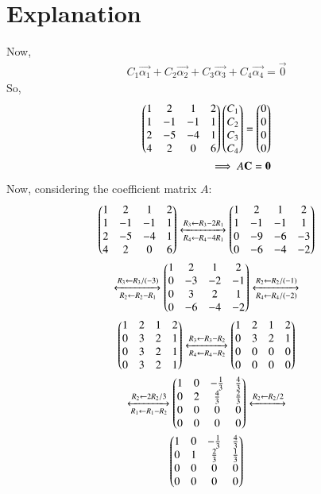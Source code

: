 \documentclass[journal,12pt,twocolumn]{IEEEtran}
\begin{document}
\section{Explanation}
Now,
\begin{align}
C_1 \vec{\alpha_1} +C_2 \vec{\alpha_2}+C_3 \vec{\alpha_3}+C_4 \vec{\alpha_4} = \vec{0}
\end{align}
So, 
\begin{align}
\begin{pmatrix}1 & 2 & 1 & 2\\1 & -1 & -1 & 1\\2 & -5 & -4 & 1\\4 & 2 & 0 & 6\end{pmatrix} \begin{pmatrix}C_1\\C_2\\C_3\\C_4\end{pmatrix} = \begin{pmatrix}0\\0\\0\\0\end{pmatrix}\\
\implies A\mathbf{C} = \mathbf{0}
\end{align}
Now, considering the coefficient matrix $A$:
\begin{multline}
\begin{pmatrix}1 & 2 & 1 & 2\\1 & -1 & -1 & 1\\2 & -5 & -4 & 1\\4 & 2 & 0 & 6\end{pmatrix} \xleftrightarrow[R_4\leftarrow R_4 - 4R_1]{R_3\leftarrow R_3-2R_1}\begin{pmatrix}1 & 2 & 1 & 2\\1 & -1 & -1 & 1\\0 & -9 & -6 & -3\\0 & -6 & -4 & -2\end{pmatrix}\\
\xleftrightarrow[R_2\leftarrow R_2 - R_1]{R_3\leftarrow R_3/(-3)}\begin{pmatrix}1 & 2 & 1 & 2\\0 & -3 & -2 & -1\\0 & 3 & 2 & 1\\0 & -6 & -4 & -2\end{pmatrix}\xleftrightarrow[R_4\leftarrow R_4/(-2)]{R_2\leftarrow R_2/(-1)}\\
\begin{pmatrix}1 & 2 & 1 & 2\\0 & 3 & 2 & 1\\0 & 3 & 2 & 1\\0 & 3 & 2 & 1\end{pmatrix}\xleftrightarrow[R_4\leftarrow R_4-R_2]{R_3\leftarrow R_3-R_2}\begin{pmatrix}1 & 2 & 1 & 2\\0 & 3 & 2 & 1\\0 & 0 & 0 & 0\\0 & 0 & 0 & 0\end{pmatrix}\\
\xleftrightarrow[R_1\leftarrow R_1-R_2]{R_2\leftarrow 2R_2/3}\begin{pmatrix}1 & 0 & -\frac{1}{3} & \frac{4}{3}\\0 & 2 & \frac{4}{3} & \frac{2}{3}\\0 & 0 & 0 & 0\\0 & 0 & 0 & 0\end{pmatrix}\xleftrightarrow[]{R_2\leftarrow R_2/2}\\
\begin{pmatrix}1 & 0 & -\frac{1}{3} & \frac{4}{3}\\0 & 1 & \frac{2}{3} & \frac{1}{3}\\0 & 0 & 0 & 0\\0 & 0 & 0 & 0\end{pmatrix}
\end{multline}
\end{document}
